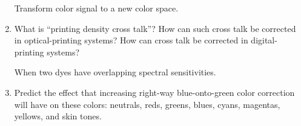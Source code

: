 \begin{enumerate}
 \par Transform color signal to a new color space. \newline
 \item
 What is “printing density cross talk”? How can such cross talk be corrected in optical-printing systems? How can cross talk be corrected in digital-printing systems? \newline
 \par When two dyes have overlapping spectral sensitivities. \newline
 \item
 Predict the effect that increasing right-way blue-onto-green color correction will have on these colors: neutrals, reds, greens, blues, cyans, magentas, yellows, and skin tones. \end{enumerate} 